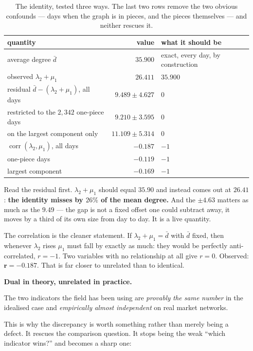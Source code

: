 \documentclass[11pt,a4paper]{article}
\newenvironment{aside}[1]
 {\par\vspace{2.5mm}\begin{lrbox}{\asidebox}%
  \begin{minipage}{\dimexpr\textwidth-16pt\relax}\small\textbf{#1}\par\vspace{1mm}}
 {\end{minipage}\end{lrbox}%
  \noindent\setlength{\fboxsep}{7pt}\setlength{\fboxrule}{.4pt}%
  \fcolorbox{Rule}{Panel2}{\usebox{\asidebox}}\par\vspace{2.5mm}}
\begin{document}
\begin{table}[h]
\centering\small
\caption{The identity, tested three ways. The last two rows remove the two
obvious confounds --- days when the graph is in pieces, and the pieces
themselves --- and neither rescues it.}
\label{tab:duality}
\begin{tabular}{@{}lrl@{}}
\toprule
quantity & value & what it should be \\
\midrule
average degree $\bar d$ & $35.900$ & exact, every day, by construction \\
observed $\lambda_2+\mu_1$ & $26.411$ & $35.900$ \\
\midrule
residual $\bar d-(\lambda_2+\mu_1)$, all days & $\mathbf{9.489\pm4.627}$ & $0$ \\
\quad restricted to the $2{,}342$ one-piece days & $9.210\pm3.595$ & $0$ \\
\quad on the largest component only & $11.109\pm5.314$ & $0$ \\
\midrule
$\operatorname{corr}(\lambda_2,\mu_1)$, all days & $\mathbf{-0.187}$ & $-1$ \\
\quad one-piece days & $-0.119$ & $-1$ \\
\quad largest component & $-0.169$ & $-1$ \\
\bottomrule
\end{tabular}
\end{table}

Read the residual first. $\lambda_2+\mu_1$ should equal $35.90$ and instead
comes out at $26.41$: \textbf{the identity misses by $26\%$ of the mean degree.}
And the $\pm4.63$ matters as much as the $9.49$ --- the gap is not a fixed
offset one could subtract away, it moves by a third of its own size from day to
day. It is a live quantity.

The correlation is the cleaner statement. If $\lambda_2+\mu_1=\bar d$ with
$\bar d$ fixed, then whenever $\lambda_2$ rises $\mu_1$ must fall by exactly as
much: they would be perfectly anti-correlated, $r=-1$. Two variables with no
relationship at all give $r=0$. Observed: $\mathbf{r=-0.187}$. That is far
closer to unrelated than to identical.

\begin{aside}{Dual in theory, unrelated in practice.}
The two indicators the field has been using are \emph{provably the same number}
in the idealised case and \emph{empirically almost independent} on real market
networks.
\end{aside}

\noindent This is why the discrepancy is worth something rather than merely
being a defect. It rescues the comparison question. It stops being the weak
``which indicator wins?'' and becomes a sharp one:
\end{document}
